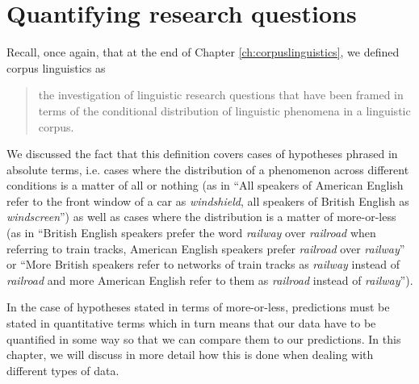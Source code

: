 \chapter{Quantifying research questions}
\label{ch:quantifyingresearch}

Recall, once again, that at the end of Chapter \ref{ch:corpuslinguistics}, we defined corpus linguistics as 

\begin{quotation}
the investigation of linguistic research questions that have been framed in terms of the conditional distribution of linguistic phenomena in a linguistic corpus.
\end{quotation}

We discussed the fact that this definition covers cases of hypotheses phrased in absolute terms, i.e. cases where the distribution of a phenomenon across different conditions is a matter of all or nothing (as in ``All speakers of American English refer to the front window of a car as \textit{windshield}, all speakers of British English as \textit{windscreen}'') as well as cases where the distribution is a matter of more-or-less (as in ``British English speakers prefer the word \textit{railway} over \textit{railroad} when referring to train tracks, American English speakers prefer \textit{railroad} over \textit{railway}'' or ``More British speakers refer to networks of train tracks as \textit{railway} instead of \textit{railroad} and more American English refer to them as \textit{railroad} instead of \textit{railway}'').

In the case of hypotheses stated in terms of more-or-less, predictions must be stated in quantitative terms which in turn means that our data have to be quantified in some way so that we can compare them to our predictions. In this chapter, we will discuss in more detail how this is done when dealing with different types of data.


